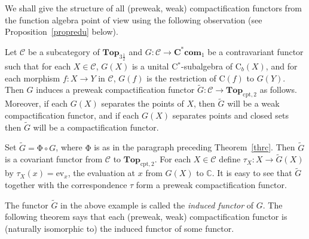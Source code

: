 \documentclass[manuscript]{amsart}
\theoremstyle{definition}
\begin{document}
We shall give the structure of all (preweak, weak) compactification functors
from the function algebra point of view
using the following
observation
(see Proposition~\ref{propredu} below).

Let $\mathcal{C}$ be a subcategory of  $\mathbf{Top}_{3\frac{1}{2}}$ and
$G:\mathcal{C}\to \mathbf{C^{*}com}_{1}$ be a contravariant functor such that
for each $X\in \mathcal{C}$, $G(X)$ is a unital C$^*$-subalgebra of $\mathrm{C}_{b}(X)$,
and for each morphism $f:X\to Y$ in $\mathcal{C}$, $G(f)$ is the restriction
of $\mathrm{C}(f)$ to $G(Y)$.
Then $G$ induces a preweak compactification functor
$\widetilde{G}:\mathcal{C}\to \mathbf{Top}_{\mathrm{cpt,2}}$ as follows.
Moreover, if each $G(X)$ separates the points of $X$, then $\widetilde{G}$ will be a weak compactification functor,
and if each $G(X)$ separates  points and closed sets then $\widetilde{G}$ will be a  compactification functor.

Set $\widetilde{G}=\mathrm{\Phi}\circ G$, where $\mathrm{\Phi}$ is as in
 the paragraph preceding Theorem~\ref{thrc}.
Then $\widetilde{G}$ is a covariant functor from $\mathcal{C}$ to
$\mathbf{Top}_{\mathrm{cpt,2}}$.
 For each $X\in \mathcal{C}$ define
$\tau_{X}:X\to \widetilde{G}(X)$ by $\tau_{X}(x)=\mathrm{ev}_{x}$, the evaluation at $x$ from
$G(X)$ to $\mathbb{C}$.
It is easy to see that $\widetilde{G}$ together with the correspondence $\tau$ form a
preweak compactification functor.

The functor $\widetilde{G}$ in the above example  is called
the \emph{induced functor} of $G$. The following theorem says that each
(preweak, weak) compactification
functor is (naturally isomorphic to) the induced functor of some functor.
\end{document}
